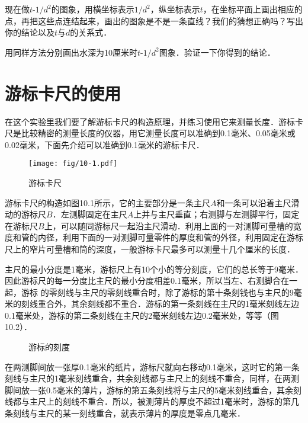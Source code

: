 现在做$t$-$1/d^2$的图象，用横坐标表示$1/d^2$，纵坐标表示$t$，在坐标平面上画出相应的点，再把这些点连结起来，画出的图象是不是一条直线？我们的猜想正确吗？写出你的结论以及$t$与$d$的关系式．

用同样方法分别画出水深为10厘米时$t$-$1/d^2$图象．验证一下你得到的结论．


\section{游标卡尺的使用}
在这个实验里我们要了解游标卡尺的构造原理，并练习使用它来测量长度．游标卡尺是比较精密的测量长度的仪器，用它测量长度可以准确到0.1毫米、0.05毫米或0.02毫米，下面先介绍可以准确到0.1毫米的游标卡尺．
\begin{figure}[htp]
    \centering
    \texttt{[image: fig/10-1.pdf]}
    \caption{游标卡尺}
\end{figure}

游标卡尺的构造如图10.1所示，它的主要部分是一条主尺$A$和一条可以沿着主尺滑动的游标尺$B$．左测脚固定在主尺$A$上并与主尺垂直；右测脚与左测脚平行，固定在游标尺$B$上，可以随同游标尺一起沿主尺滑动．利用上面的一对测脚可量槽的宽度和管的内径，利用下面的一对测脚可量零件的厚度和管的外径，利用固定在游标尺上的窄片可量槽和筒的深度，一般游标卡尺最多可以测量十几个厘米的长度．
	
主尺的最小分度是1毫米，游标尺上有10个小的等分刻度，它们的总长等于9毫米．因此游标尺的每一分度比主尺的最小分度相差0.1毫米，所以当左、右测脚合在一起，游标
的零刻线与主尺的零刻线重合时，除了游标的第十条刻钱也与主尺的9毫米的刻线重合外，其余刻线都不重合．游标的第一条刻线在主尺的1毫米刻线左边0.1毫米处，游标的第二条刻线在主尺的2毫米刻线左边0.2毫米处，等等（图10.2）．	
	

\begin{figure}[htp]\centering
    \caption{游标的刻度}
\end{figure}

在两测脚间放一张厚0.1毫米的纸片，游标尺就向右移动0.1毫米，这时它的第一条刻线与主尺的1毫米刻线重合，共余刻线都与主尺上的刻线不重合，同样，在两测脚间放一张0.5毫米的薄片，游标的第五条刻线将与主尺的5毫米刻线重合，其余刻线都与主尺上的刻线不重合．所以，被测薄片的厚度不超过1毫米时，游标的第几条刻线与主尺的某一刻线重合，就表示薄片的厚度是零点几毫米．

